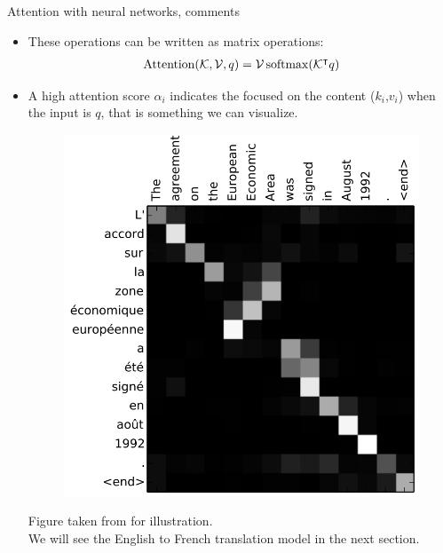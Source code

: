 \begin{frame}{Attention with neural networks, comments}
\begin{itemize}
\item These operations can be written as matrix operations:
      \begin{eqnarray*}
              \operatorname{Attention}(\mathcal{K},\mathcal{V}, q) = \mathcal{V} \operatorname{softmax}(\mathcal{K}^{\intercal}q)
      \end{eqnarray*}
\vspace{-3mm}
\pause
\item A high attention score $\alpha_i$ indicates the  focused on the content ($k_i$,$v_i$) when the input is $q$, that is something we can visualize.
\begin{figure}
                        \centering
                        \includegraphics[width=0.35\linewidth]{./figures/bahdanau_att.png}
\end{figure}
{\scriptsize Figure taken from  for illustration.\\
We will see the English to French translation model in the next section.}
\end{itemize}
\end{frame}


